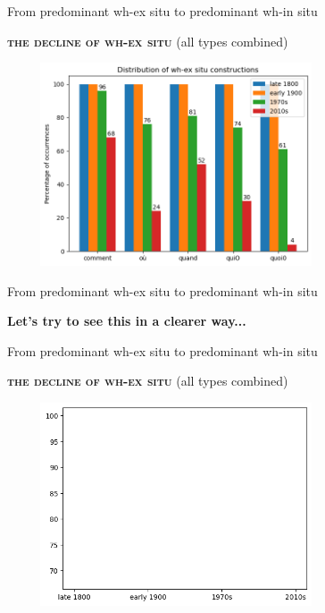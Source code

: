 \documentclass[lesson_slides]{subfiles}
\begin{document}
\begin{frame}[c]{From predominant wh-ex situ to predominant wh-in situ}

    \textbf{\textsc{the decline of wh-ex situ}} (all types combined)
    \begin{center}
        \includegraphics[width=10cm, height=6cm]{images/exsitu5.png}
    \end{center}
  
\end{frame}
\begin{frame}[c]{From predominant wh-ex situ to predominant wh-in situ}

\begin{center}
    \textbf{Let's try to see this in a clearer way...}
\end{center}
  
\end{frame}
\begin{frame}[c]{From predominant wh-ex situ to predominant wh-in situ}

    \textbf{\textsc{the decline of wh-ex situ}} \pause (all types combined) \pause
    \begin{center}
        \includegraphics[width=10cm, height=6cm]{images/empty.png}
    \end{center}
  
\end{frame}
\end{document}
